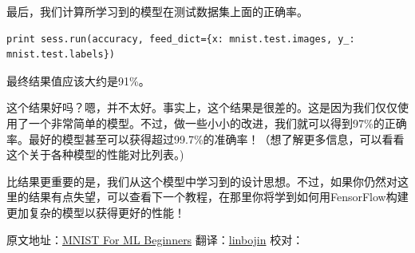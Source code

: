 最后，我们计算所学习到的模型在测试数据集上面的正确率。

\begin{lstlisting}
print sess.run(accuracy, feed_dict={x: mnist.test.images, y_: mnist.test.labels})
\end{lstlisting}

最终结果值应该大约是91\%。

这个结果好吗？嗯，并不太好。事实上，这个结果是很差的。这是因为我们仅仅使用了一个非常简单的模型。不过，做一些小小的改进，我们就可以得到97\%的正确率。最好的模型甚至可以获得超过99.7\%的准确率！（想了解更多信息，可以看看这个关于各种模型的性能对比列表。)

比结果更重要的是，我们从这个模型中学习到的设计思想。不过，如果你仍然对这里的结果有点失望，可以查看下一个教程，在那里你将学到如何用FensorFlow构建更加复杂的模型以获得更好的性能！

原文地址：\href{http://tensorflow.org/tutorials/mnist/beginners/index.md}{MNIST For ML Beginners}
翻译：\href{https://github.com/linbojin}{linbojin} 校对：
